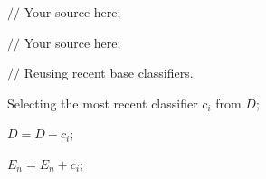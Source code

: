 \documentclass[12pt]{article}
\begin{document}
\begin{CJK}{UTF8}{gbsn}
\begin{algorithm}[h]
\begin{algorithmic}[1]
            \STATE $//$ Your source here; 
        \ENDFOR 

         


            \STATE $//$ Your source here; 

        \ENDFOR 

         

        \STATE  $//$ Reusing recent base classifiers. \label{code:recentStart} 


            \STATE  Selecting the most recent classifier $c_i$ from $D$; 

            \STATE  $D=D-c_i$; 

            \STATE  $E_n=E_n+c_i$; 

        \ENDWHILE \label{code:recentEnd} 

         

    \end{algorithmic} 

\end{algorithm} 

\end{CJK}
\end{document}
